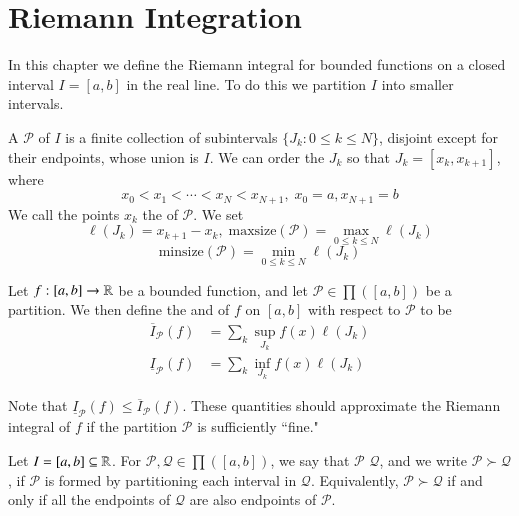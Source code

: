 \chapter{Riemann Integration}\label{RiemannInt}


In this chapter we define the Riemann integral for bounded functions on a closed interval $I = [a,b]$ in the real line. To do this we partition $I$ into smaller intervals.

\begin{definition}
    A  $\mathcal{P}$ of $I$ is a finite collection of subintervals $\{J_k:0 \leq k \leq N\}$, disjoint except for their endpoints, whose union is $I$. We can order the $J_k$ so that $J_k = [x_k,x_{k+1}]$, where $$x_0 < x_1 < \cdots < x_N < x_{N+1},\;x_0 = a, x_{N+1} = b$$
    We call the points $x_k$ the  of $\mathcal{P}$. We set $$\ell(J_k) = x_{k+1} - x_k,\;\text{maxsize}(\mathcal{P}) = \max_{0\leq k \leq N}\ell(J_k)$$ $$\text{minsize}(\mathcal{P}) = \min_{0\leq k \leq N}\ell(J_k)$$
\end{definition}

\begin{definition}
    Let $f:[a,b]\rightarrow \mathbb R$ be a bounded function, and let $\mathcal{P} \in \prod([a,b])$ be a partition. We then define the  and  of $f$ on $[a,b]$ with respect to $\mathcal{P}$ to be \begin{align*}
        \overline{I}_{\mathcal{P}}(f) &= \sum_k\sup_{J_k}f(x)\ell(J_k) \\
        \underline{I}_{\mathcal{P}}(f) &= \sum_k\inf_{J_k}f(x)\ell(J_k)
    \end{align*}
\end{definition}

Note that $\underline{I}_{\mathcal{P}}(f) \leq \overline{I}_{\mathcal{P}}(f)$. These quantities should approximate the Riemann integral of $f$ if the partition $\mathcal{P}$ is sufficiently ``fine."

\begin{definition}
    Let $I = [a,b] \subseteq \mathbb R$. For $\mathcal{P},\mathcal{Q} \in \prod([a,b])$, we say that $\mathcal{P}$  $\mathcal{Q}$, and we write $\mathcal{P}\succ \mathcal{Q}$, if $\mathcal{P}$ is formed by partitioning each interval in $\mathcal{Q}$. Equivalently, $\mathcal{P} \succ \mathcal{Q}$ if and only if all the endpoints of $\mathcal{Q}$ are also endpoints of $\mathcal{P}$.
\end{definition}

